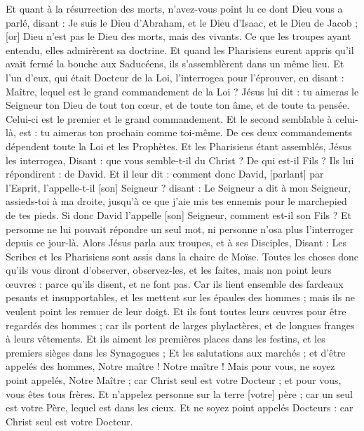 \begin{multicols}{2}
Et quant à la résurrection des morts, n'avez-vous point lu ce dont Dieu vous a parlé, disant :
Je suis le Dieu d'Abraham, et le Dieu d'Isaac, et le Dieu de Jacob ; [or] Dieu n'est pas le Dieu des morts, mais des vivants.
Ce que les troupes ayant entendu, elles admirèrent sa doctrine.
Et quand les Pharisiens eurent appris qu'il avait fermé la bouche aux Saducéens, ils s'assemblèrent dans un même lieu.
Et l'un d'eux, qui était Docteur de la Loi, l'interrogea pour l'éprouver, en disant :
Maître, lequel est le grand commandement de la Loi ?
Jésus lui dit : tu aimeras le Seigneur ton Dieu de tout ton cœur, et de toute ton âme, et de toute ta pensée.
Celui-ci est le premier et le grand commandement.
Et le second semblable à celui-là, est : tu aimeras ton prochain comme toi-même.
De ces deux commandements dépendent toute la Loi et les Prophètes.
Et les Pharisiens étant assemblés, Jésus les interrogea,
Disant : que vous semble-t-il du Christ ? De qui est-il Fils ? Ils lui répondirent : de David.
Et il leur dit : comment donc David, [parlant] par l'Esprit, l'appelle-t-il [son] Seigneur ? disant :
Le Seigneur a dit à mon Seigneur, assieds-toi à ma droite, jusqu'à ce que j'aie mis tes ennemis pour le marchepied de tes pieds.
Si donc David l'appelle [son] Seigneur, comment est-il son Fils ?
Et personne ne lui pouvait répondre un seul mot, ni personne n'osa plus l'interroger depuis ce jour-là.
\VerseOne{}Alors Jésus parla aux troupes, et à ses Disciples,
Disant : Les Scribes et les Pharisiens sont assis dans la chaire de Moïse.
Toutes les choses donc qu'ils vous diront d'observer, observez-les, et les faites, mais non point leurs œuvres : parce qu'ils disent, et ne font pas.
Car ils lient ensemble des fardeaux pesants et insupportables, et les mettent sur les épaules des hommes ; mais ils ne veulent point les remuer de leur doigt.
Et ils font toutes leurs œuvres pour être regardés des hommes ; car ils portent de larges phylactères, et de longues franges à leurs vêtements.
Et ils aiment les premières places dans les festins, et les premiers sièges dans les Synagogues ;
Et les salutations aux marchés ; et d'être appelés des hommes, Notre maître ! Notre maître !
Mais pour vous, ne soyez point appelés, Notre Maître ; car Christ seul est votre Docteur ; et pour vous, vous êtes tous frères.
Et n'appelez personne sur la terre [votre] père ; car un seul est votre Père, lequel est dans les cieux.
Et ne soyez point appelés Docteurs : car Christ seul est votre Docteur.

\end{multicols}
